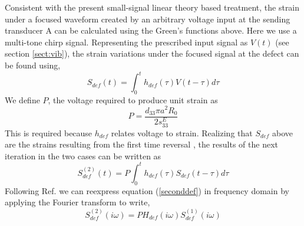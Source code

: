 \documentclass[11pt,letterpaper]{article}%
\begin{document}
Consistent with the present small-signal linear theory based
treatment, the strain under  a focused waveform created by an
arbitrary voltage input at the sending transducer  A can be
calculated using the Green's functions above.  Here we use %
a multi-tone chirp signal. Representing the prescribed input
signal as $V(t)$ (see section \ref{sect:vib}), the strain
variations under the focused signal at the defect can be found
using,
\begin{equation}
S_{def}(t) = \int_0^t h_{def}(\tau)V(t-\tau)d\tau \label{strconv2}
\end{equation}
We define $P$, the voltage required to produce unit strain as
\begin{equation}
P = \frac{d_{33}\pi a^2 R_0}{2 s^E_{33}} \label{gam1}
\end{equation}%
 This is required because $h_{def}$ relates voltage to strain.
 Realizing that $S_{def}$ above are the strains
 resulting from the first time reversal \cite{fink}, the results of the next
 iteration in the two cases can be written as
\begin{equation}
 S^{(2)}_{def}(t) =
 P\int_0^th_{def}(\tau)S_{def}(t-\tau)d\tau
 \label{seconddef}
 \end{equation}
 Following Ref. \cite{fink} we can reexpress equation
 (\ref{seconddef}) in frequency domain by
 applying the Fourier transform to write,
\begin{equation}
S^{(2)}_{def}(i\omega) = P H_{def}(i\omega)S^{(1)}_{def}(i\omega)
\label{spec2}
\end{equation}
%
%
\end{document}

